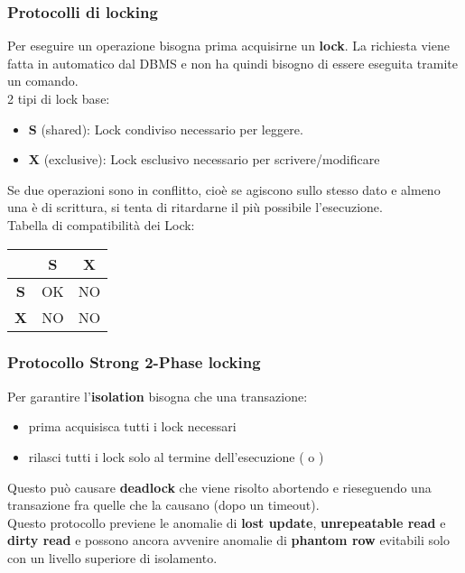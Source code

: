 \subsubsection{Protocolli di locking}
Per eseguire un operazione bisogna prima acquisirne un \textbf{lock}. La richiesta viene fatta in automatico dal DBMS e non ha quindi bisogno di essere eseguita tramite un comando.\\
2 tipi di lock base:
\begin{itemize}
    \item \textbf{S} (shared): Lock condiviso necessario per leggere.
    \item \textbf{X} (exclusive): Lock esclusivo necessario per scrivere/modificare
\end{itemize}
Se due operazioni sono in conflitto, cioè se agiscono sullo stesso dato e almeno una \`e di scrittura, si tenta di ritardarne il più possibile l'esecuzione.\\
Tabella di compatibilità dei Lock:
\begin{table}[H]
\centering
\begin{tabular}{|c|c|c|}
\hline
           & \textbf{S} & \textbf{X} \\ \hline
\textbf{S} & OK         & NO         \\ \hline
\textbf{X} & NO         & NO         \\ \hline
\end{tabular}
\end{table}

\subsubsection{Protocollo Strong 2-Phase locking}
\noindent Per garantire l'\textbf{isolation} bisogna che una transazione:
\begin{itemize}
    \item prima acquisisca tutti i lock necessari
    \item rilasci tutti i lock solo al termine dell'esecuzione ( o )
\end{itemize}
Questo può causare \textbf{deadlock} che viene risolto abortendo e rieseguendo una transazione fra quelle che la causano (dopo un timeout).\\
Questo protocollo previene le anomalie di \textbf{lost update}, \textbf{unrepeatable read} e \textbf{dirty read} e possono ancora avvenire anomalie di \textbf{phantom row} evitabili solo con un livello superiore di isolamento.

